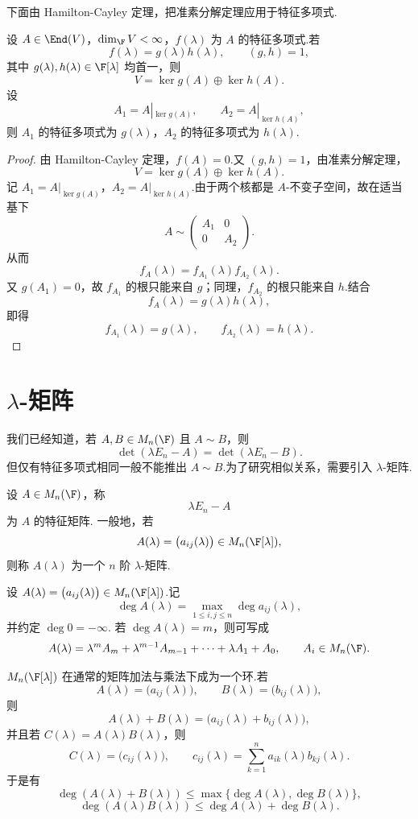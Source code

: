 下面由 Hamilton-Cayley 定理，把准素分解定理应用于特征多项式.

\begin{example}
设 $A\in\End(V)$，$\dim_{\F}V<\infty$，$f(\lambda)$ 为 $A$ 的特征多项式.若
\[
f(\lambda)=g(\lambda)h(\lambda),
\qquad (g,h)=1,
\]
其中 $g(\lambda),h(\lambda)\in\F[\lambda]$ 均首一，则
\[
V=\ker g(A)\oplus\ker h(A).
\]
设
\[
A_1=A|_{\ker g(A)},
\qquad
A_2=A|_{\ker h(A)},
\]
则 $A_1$ 的特征多项式为 $g(\lambda)$，$A_2$ 的特征多项式为 $h(\lambda)$.
\end{example}

\begin{proof}
由 Hamilton-Cayley 定理，$f(A)=0$.又 $(g,h)=1$，由准素分解定理，
\[
V=\ker g(A)\oplus\ker h(A).
\]
记 $A_1=A|_{\ker g(A)}$，$A_2=A|_{\ker h(A)}$.由于两个核都是 $A$-不变子空间，故在适当基下
\[
A\sim \begin{pmatrix}
A_1&0\\
0&A_2
\end{pmatrix}.
\]
从而
\[
f_A(\lambda)=f_{A_1}(\lambda)f_{A_2}(\lambda).
\]
又 $g(A_1)=0$，故 $f_{A_1}$ 的根只能来自 $g$；同理，$f_{A_2}$ 的根只能来自 $h$.结合
\[
f_A(\lambda)=g(\lambda)h(\lambda),
\]
即得
\[
f_{A_1}(\lambda)=g(\lambda),
\qquad
f_{A_2}(\lambda)=h(\lambda).
\]
\end{proof}
\section{$\lambda$-矩阵}

我们已经知道，若 $A,B\in M_n(\F)$ 且 $A\sim B$，则
\[
\det(\lambda E_n-A)=\det(\lambda E_n-B).
\]
但仅有特征多项式相同一般不能推出 $A\sim B$.为了研究相似关系，需要引入 $\lambda$-矩阵.

\begin{definition}
	设 $A\in M_n(\F)$，称
	\[
	\lambda E_n-A
	\]
	为 $A$ 的特征矩阵.
	一般地，若
	\[
	A(\lambda)=\bigl(a_{ij}(\lambda)\bigr)\in M_n(\F[\lambda]),
	\]
	则称 $A(\lambda)$ 为一个 $n$ 阶 $\lambda$-矩阵.
\end{definition}

设 $A(\lambda)=\bigl(a_{ij}(\lambda)\bigr)\in M_n(\F[\lambda])$.记
\[
\deg A(\lambda)=\max_{1\leq i,j\leq n}\deg a_{ij}(\lambda),
\]
并约定 $\deg0=-\infty$.
若 $\deg A(\lambda)=m$，则可写成
\[
A(\lambda)=\lambda^mA_m+\lambda^{m-1}A_{m-1}+\cdots+\lambda A_1+A_0,
\qquad A_i\in M_n(\F).
\]

$M_n(\F[\lambda])$ 在通常的矩阵加法与乘法下成为一个环.若
\[
A(\lambda)=\bigl(a_{ij}(\lambda)\bigr),
\qquad
B(\lambda)=\bigl(b_{ij}(\lambda)\bigr),
\]
则
\[
A(\lambda)+B(\lambda)=\bigl(a_{ij}(\lambda)+b_{ij}(\lambda)\bigr),
\]
并且若 $C(\lambda)=A(\lambda)B(\lambda)$，则
\[
C(\lambda)=\bigl(c_{ij}(\lambda)\bigr),
\qquad
c_{ij}(\lambda)=\sum_{k=1}^n a_{ik}(\lambda)b_{kj}(\lambda).
\]
于是有
\[
\deg(A(\lambda)+B(\lambda))\leq \max\{\deg A(\lambda),\deg B(\lambda)\},
\]
\[
\deg(A(\lambda)B(\lambda))\leq \deg A(\lambda)+\deg B(\lambda).
\]


